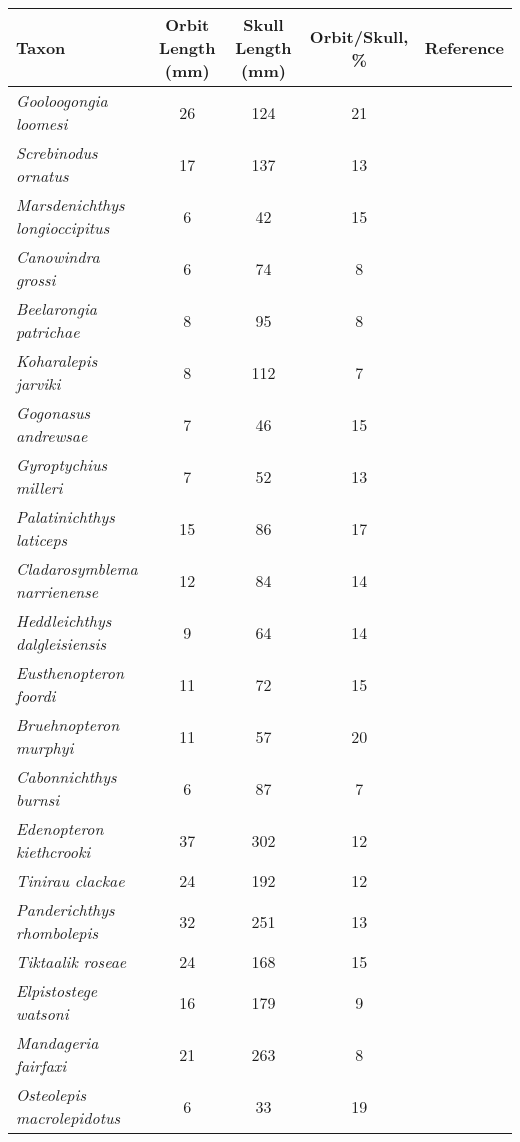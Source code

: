 \begin{tabular}{|L{4.5cm}|c|c|c|L{4.5cm}|}
\hline
\textbf{Taxon}&\textbf{Orbit Length (mm)}&\textbf{Skull Length (mm)}&\textbf{Orbit/Skull, \%}&\textbf{Reference}\\\hline
\textit{Gooloogongia loomesi}&26&124&21&\citet{Joha98a}\\\hline
\textit{Screbinodus ornatus}&17&137&13&\citet{Jeff12a}\\\hline
\textit{Marsdenichthys longioccipitus}&6&42&15&\citet{Holl10a}\\\hline
\textit{Canowindra grossi}&6&74&8&\citet{Long85a}\\\hline
\textit{Beelarongia patrichae}&8&95&8&\citet{Long87a}\\\hline
\textit{Koharalepis jarviki}&8&112&7&\citet{Youn92a}\\\hline
\textit{Gogonasus andrewsae}&7&46&15&\citet{Long06a}\\\hline
\textit{Gyroptychius  milleri}&7&52&13&\citet{Newm15a}\\\hline
\textit{Palatinichthys laticeps}&15&86&17&\citet{Witz12a}\\\hline
\textit{Cladarosymblema narrienense}&12&84&14&\citet{Fox95a}\\\hline
\textit{Heddleichthys dalgleisiensis}&9&64&14&\citet{Snit09a}\\\hline
\textit{Eusthenopteron foordi}&11&72&15&\citet{Mark07a}\\\hline
\textit{Bruehnopteron  murphyi}&11&57&20&\citet{Schu12a}\\\hline
\textit{Cabonnichthys burnsi}&6&87&7&\citet{Ahlb97a}\\\hline
\textit{Edenopteron kiethcrooki}&37&302&12&\citet{Youn13a}\\\hline
\textit{Tinirau clackae}&24&192&12&\citet{Swar12a}\\\hline
\textit{Panderichthys rhombolepis}&32&251&13&\citet{Voro91a}\\\hline
\textit{Tiktaalik roseae}&24&168&15&\citet{Daes06a}\\\hline
\textit{Elpistostege watsoni}&16&179&9&\citet{Schu85a}\\\hline
\textit{Mandageria fairfaxi}&21&263&8&\citet{Joha97a}\\\hline
\textit{Osteolepis macrolepidotus}&6&33&19&\citet{Jarv48a}\\\hline
\end{tabular}
